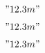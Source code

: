 \documentclass[12pt]{article}
\begin{document}
 $"12.3 m"$

\makeatletter\fkssug@rczech\makeatother

 $"12.3 m"$

\makeatletter\fkssug@renglish\makeatother

 $"12.3 m"$
\end{document}

